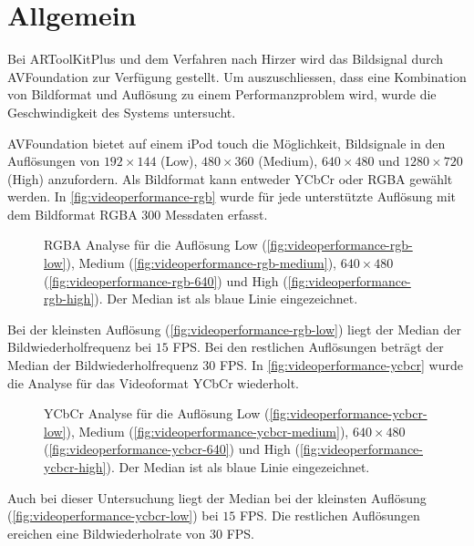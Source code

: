 \section{Allgemein} %
\label{sec:allgemein}

Bei ARToolKitPlus und dem Verfahren nach Hirzer wird das Bildsignal durch AVFoundation zur Verfügung gestellt. Um
 auszuschliessen, dass eine Kombination von Bildformat und Auflösung zu einem Performanzproblem wird, wurde die
 Geschwindigkeit des Systems untersucht.

AVFoundation bietet auf einem iPod touch die Möglichkeit, Bildsignale in den Auflösungen von $192 \times 144$ (Low),
 $480 \times 360$ (Medium), $640 \times 480$ und $1280 \times 720$ (High) anzufordern. Als Bildformat kann entweder
 YCbCr oder RGBA gewählt werden. In \autoref{fig:videoperformance-rgb} wurde für jede unterstützte
 Auflösung mit dem Bildformat RGBA $300$ Messdaten erfasst.
\begin{figure}[!ht]
	\centering
	\caption{RGBA Analyse für die Auflösung Low (\autoref{fig:videoperformance-rgb-low}),
	 Medium (\autoref{fig:videoperformance-rgb-medium}), $640 \times 480$ (\autoref{fig:videoperformance-rgb-640}) und
	 High (\autoref{fig:videoperformance-rgb-high}). Der Median ist als blaue Linie eingezeichnet.}
	\label{fig:videoperformance-rgb}
\end{figure}
Bei der kleinsten Auflösung (\autoref{fig:videoperformance-rgb-low}) liegt der Median der Bildwiederholfrequenz bei $15$
 FPS. Bei den restlichen Auflösungen beträgt der Median der Bildwiederholfrequenz $30$ FPS. In
 \autoref{fig:videoperformance-ycbcr} wurde die Analyse für das Videoformat YCbCr wiederholt.
\begin{figure}[!ht]
	\centering
	\caption{YCbCr Analyse für die Auflösung Low (\autoref{fig:videoperformance-ycbcr-low}),
	 Medium (\autoref{fig:videoperformance-ycbcr-medium}), $640 \times 480$ (\autoref{fig:videoperformance-ycbcr-640})
	 und High (\autoref{fig:videoperformance-ycbcr-high}). Der Median ist als blaue Linie eingezeichnet.}
	\label{fig:videoperformance-ycbcr}
\end{figure}
Auch bei dieser Untersuchung liegt der Median bei der kleinsten Auflösung (\autoref{fig:videoperformance-ycbcr-low})
 bei $15$ FPS. Die restlichen Auflösungen ereichen eine Bildwiederholrate von $30$ FPS.

